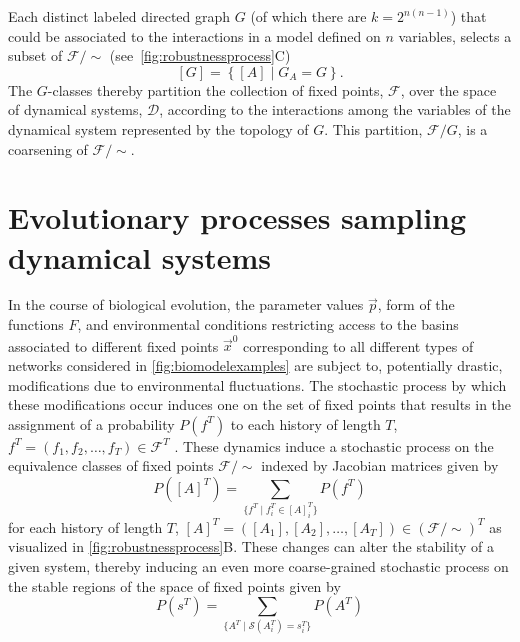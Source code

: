 Each distinct labeled directed graph $G$ (of which there are $k=2^{n(n-1)}$) that could be associated to the interactions in a model defined on $n$ variables, selects a subset of $\mathcal{F} / {\sim}$ (see~\ref{fig:robustnessprocess}C)
\begin{equation}\label{eq:jacgrapheqs}
[G] = \left\{ [A] \; | \; G_A = G \right\}.
\end{equation}
The $G$-classes thereby partition the collection of fixed points, $\mathcal{F}$, over the space of dynamical systems, $\mathcal{D}$, according to the interactions among the variables of the dynamical system represented by the topology of $G$. This partition, $\mathcal{F} / G$, is a coarsening of $\mathcal{F} / {\sim}$.

\section{Evolutionary processes sampling dynamical systems}
In the course of biological evolution, the parameter values $\vec{p}$, form of the functions $F$, and environmental conditions restricting access to the basins associated to different fixed points $\vec{x}^0$ corresponding to all different types of networks considered in \ref{fig:biomodelexamples} are subject to, potentially drastic, modifications due to environmental fluctuations. The stochastic process by which these modifications occur induces one on the set of fixed points that results in the assignment of a probability $P(f^T)$ to each history of length $T$, $f^T = ( f_1,f_2,\ldots,f_T ) \in \mathcal{F}^T$ \cite{RobertM.Gray130}.
These dynamics induce a stochastic process on the equivalence classes of fixed points $\mathcal{F}/{\sim}$ indexed by Jacobian matrices given by
$$
P([A]^T) = \sum_{ \{ f^T \mid f_i^T \in [A]_i^T \} } P(f^T)
$$
for each history of length $T$, $[A]^T = ( [A_1], [A_2], \ldots, [A_T] ) \in (\mathcal{F}/{\sim})^T$
as visualized in \ref{fig:robustnessprocess}B. These changes can alter the stability of a given system, thereby inducing an even more coarse-grained stochastic process on the stable regions of the space of fixed points given by
$$
P(s^T) = \sum_{ \{ A^T \mid \mathcal{S}(A_i^T) = s_i^T \} } P(A^T)
$$
